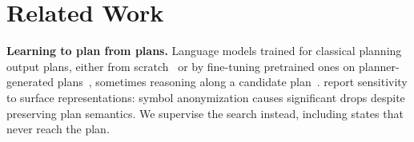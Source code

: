 \section{Related Work}
\label{sec:related}

\textbf{Learning to plan from plans.} Language models trained for classical planning output plans, either from scratch~\citep{rossetti2024learning} or by fine-tuning pretrained ones on planner-generated plans~\citep{pallagani2022plansformer,bohnet2024exploring,li2024unlocking,belcamino2026generalization}, sometimes reasoning along a candidate plan~\citep{verma2025teaching,emami2026close}. \citet{belcamino2026generalization} report sensitivity to surface representations: symbol anonymization causes significant drops despite preserving plan semantics. We supervise the search instead, including states that never reach the plan.

